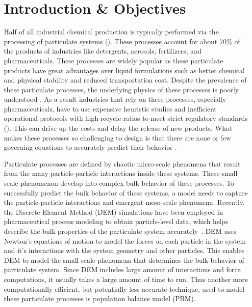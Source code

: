 \documentclass[preprint,11pt,authoryear]{elsarticle}
\begin{document}
\section{Introduction \& Objectives} 
Half of all industrial chemical production is typically performed via the 
processing of particulate systems
(\cite{seville1997}). These processes account for about 70\% of the products 
of industries like detergents, aerosols, fertilizers, and pharmaceuticals\citep{Litster2016}. 
These processes are widely popular as these particulate products have great advantages over 
liquid formulations such as better chemical and physical stability and reduced 
transportation cost. Despite the prevalence of these particulate processes, the underlying 
physics of these processes is poorly understood \citep{Rogers2013}. As a result industries 
that rely on these processes, especially pharmaceuticals, have to use expensive 
heuristic studies and inefficient operational protocols with high recycle ratios to meet strict 
regulatory standards (\cite{Ramachandran2009}). This can drive up the costs and delay the release of 
new products. What makes these processes so challenging to design is that there are none or few governing 
equations to accurately predict their behavior \citep{sen2013}.

Particulate processes are defined by chaotic micro-scale phenomena that result from the many 
particle-particle interactions inside these systems. These small scale phenomenon develop into 
complex bulk behavior of these processes. To successfully predict the bulk behavior of these 
systems, a model needs to capture the particle-particle interactions and emergent meso-scale phenomena. 
Recently, the Discrete Element Method (DEM)\citep{Cundall1979} simulations have been employed in 
pharmaceutical process modeling to obtain particle-level data, which helps describe the bulk properties
of the particulate system accurately~\citep{Hancock2011}. DEM uses Newton's equations of 
motion to model the forces on each particle in the system and it's interactions with the system 
geometry and other particles. This enables DEM to model the small scale phenomena that 
determines the bulk behavior of particulate system. Since DEM includes large amount of interactions
and force computations, it usually takes a large amount of time to run. Thus another more computationally 
efficient, but potentially less accurate technique, used to model these particulate processes is population 
balance model (PBM).
\end{document}

